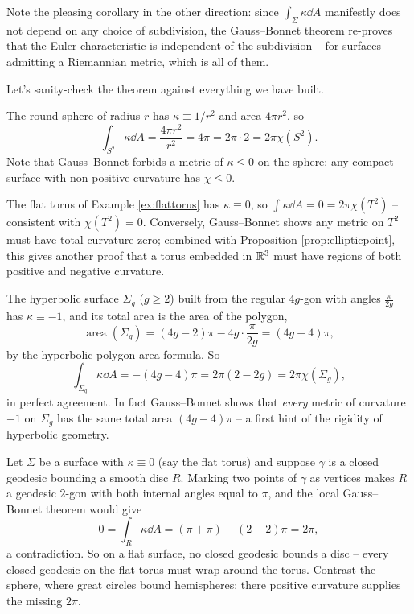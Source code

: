 \documentclass[a4paper]{scrartcl}
\begin{document}
\begin{remark}
    Note the pleasing corollary in the other direction: since $\int_\Sigma \kappa \dd A$ manifestly does not depend on any choice of subdivision, the Gauss--Bonnet theorem re-proves that the Euler characteristic is independent of the subdivision -- for surfaces admitting a Riemannian metric, which is all of them.
\end{remark}

Let's sanity-check the theorem against everything we have built.

\begin{example}
    The round sphere of radius $r$ has $\kappa \equiv 1/r^2$ and area $4\pi r^2$, so
    $$
    \int_{S^2} \kappa \dd A = \frac{4 \pi r^2}{r^2} = 4\pi = 2\pi \cdot 2 = 2\pi \chi(S^2).
    $$
    Note that Gauss--Bonnet forbids a metric of $\kappa \leq 0$ on the sphere: any compact surface with non-positive curvature has $\chi \leq 0$.
\end{example}

\begin{example}
    The flat torus of Example \ref{ex:flattorus} has $\kappa \equiv 0$, so $\int \kappa \dd A = 0 = 2\pi\chi(T^2)$ -- consistent with $\chi(T^2) = 0$. Conversely, Gauss--Bonnet shows any metric on $T^2$ must have total curvature zero; combined with Proposition \ref{prop:ellipticpoint}, this gives another proof that a torus embedded in $\mathbb{R}^3$ must have regions of both positive and negative curvature.
\end{example}

\begin{example}
    The hyperbolic surface $\Sigma_g$ ($g \geq 2$) built from the regular $4g$-gon with angles $\frac{\pi}{2g}$ has $\kappa \equiv -1$, and its total area is the area of the polygon,
    $$
    \operatorname{area}(\Sigma_g) = (4g - 2)\pi - 4g \cdot \frac{\pi}{2g} = (4g - 4)\pi,
    $$
    by the hyperbolic polygon area formula. So
    $$
    \int_{\Sigma_g} \kappa \dd A = -(4g - 4)\pi = 2\pi(2 - 2g) = 2\pi \chi(\Sigma_g),
    $$
    in perfect agreement. In fact Gauss--Bonnet shows that \emph{every} metric of curvature $-1$ on $\Sigma_g$ has the same total area $(4g - 4)\pi$ -- a first hint of the rigidity of hyperbolic geometry.
\end{example}

\begin{example}
    Let $\Sigma$ be a surface with $\kappa \equiv 0$ (say the flat torus) and suppose $\gamma$ is a closed geodesic bounding a smooth disc $R$. Marking two points of $\gamma$ as vertices makes $R$ a geodesic $2$-gon with both internal angles equal to $\pi$, and the local Gauss--Bonnet theorem would give
    $$
    0 = \int_R \kappa \dd A = (\pi + \pi) - (2 - 2)\pi = 2\pi,
    $$
    a contradiction. So on a flat surface, no closed geodesic bounds a disc -- every closed geodesic on the flat torus must wrap around the torus. Contrast the sphere, where great circles bound hemispheres: there positive curvature supplies the missing $2\pi$.
\end{example}
\end{document}
